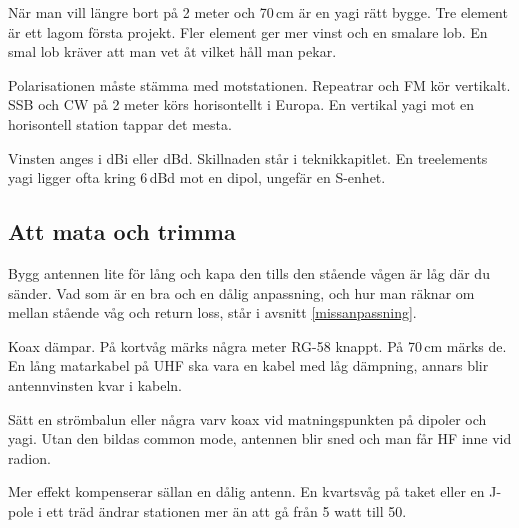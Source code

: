 När man vill längre bort på 2 meter och 70\,cm är en yagi rätt bygge. Tre
element är ett lagom första projekt. Fler element ger mer vinst och en
smalare lob. En smal lob kräver att man vet åt vilket håll man pekar.

Polarisationen måste stämma med motstationen. Repeatrar och FM kör
vertikalt. SSB och CW på 2 meter körs horisontellt i Europa. En vertikal
yagi mot en horisontell station tappar det mesta.

Vinsten anges i dBi eller dBd. Skillnaden står i teknikkapitlet. En
treelements yagi ligger ofta kring 6\,dBd mot en dipol, ungefär en
S-enhet.

\subsection{Att mata och trimma}

Bygg antennen lite för lång och kapa den tills den stående vågen är låg där
du sänder. Vad som är en bra och en dålig anpassning, och hur man räknar om
mellan stående våg och return loss, står i avsnitt \ref{missanpassning}.

Koax dämpar. På kortvåg märks några meter RG-58 knappt. På 70\,cm märks de.
En lång matarkabel på UHF ska vara en kabel med låg dämpning, annars blir
antennvinsten kvar i kabeln.

Sätt en strömbalun eller några varv koax vid matningspunkten på dipoler och
yagi. Utan den bildas common mode, antennen blir sned och man får HF inne
vid radion.

Mer effekt kompenserar sällan en dålig antenn. En kvartsvåg på taket eller
en J-pole i ett träd ändrar stationen mer än att gå från 5 watt till 50.


